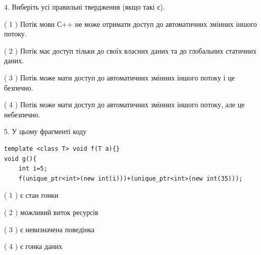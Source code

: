\documentclass[12pt, ukrainian]{article}
\begin{document}
\begin {large}
{%
4. Виберіть усі правильні твердження (якщо такі є).\par
\vspace{2mm}

( 1 ) Потік мови С++ не може отримати доступ до автоматичних змінних іншого потоку.%

( 2 ) Потік має доступ тільки до своїх власних даних та до глобальних статичних даних.%

( 3 ) Потік може мати доступ до автоматичних змінних іншого потоку і це безпечно.%

( 4 ) Потік може мати доступ до автоматичних змінних іншого потоку, але це небезпечно.%


5. У цьому фрагменті коду
\begin{verbatim}
template <class T> void f(T a){}
void g(){
    int i=5;
    f(unique_ptr<int>(new int(i)))+(unique_ptr<int>(new int(35)));
\end{verbatim}
( 1 ) є стан гонки%

( 2 ) можливий виток ресурсів%

( 3 ) є невизначена поведінка%

( 4 ) є гонка даних%
}
\end {large}
\end{document}

